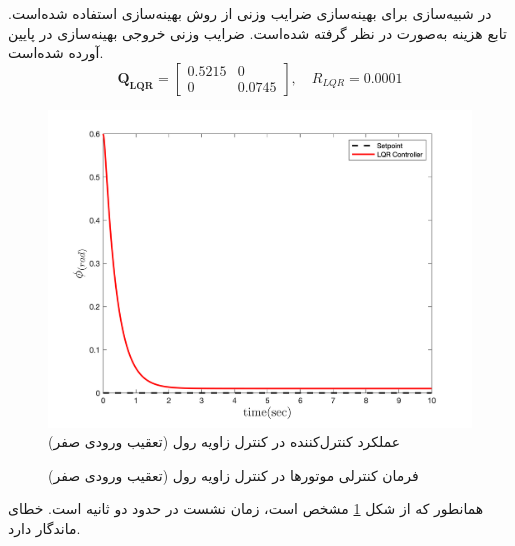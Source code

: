  
 
  در شبیه‌سازی برای بهینه‌سازی ضرایب وزنی  از روش بهینه‌سازی
 \cite{Karimi2010}
استفاده شده‌است.
تابع هزینه  به‌صورت
در نظر گرفته شده‌است. ضرایب وزنی خروجی بهینه‌سازی در پایین آورده شده‌است.
\begin{equation}
	\boldsymbol{Q_{LQR}} = \begin{bmatrix}
		0.5215 & 0\\
		0 & 0.0745
	\end{bmatrix}, \quad R_{LQR} =  0.0001
\end{equation} 
\begin{figure}[H]
	\includegraphics[width=.48\linewidth]{../Figures/MIL/LQR/Roll/lqr_roll_nn.png}
	\centering
	\caption{عملكرد کنترل‌کننده  در کنترل زاويه رول (تعقیب ورودی صفر)}
	\label{lqr_roll_figure_simulation}
\end{figure}
\begin{figure}[H]
	\centering
	\caption{‫‪فرمان کنترلی موتورها در کنترل زاویه رول (تعقیب ورودی صفر)}
\end{figure}


همانطور که از شکل
\ref{lqr_roll_figure_simulation}
مشخص است، زمان نشست در حدود دو ثانیه است. خطای ماندگار دارد.